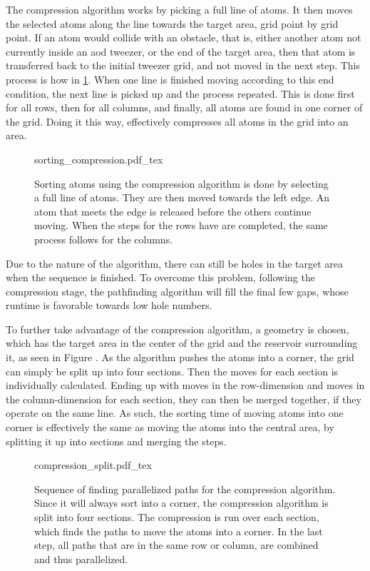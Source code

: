 The compression algorithm works by picking a full line of atoms. It then moves the selected atoms along the line towards the target area, grid point by grid point. If an atom would collide with an obstacle, that is, either another atom not currently inside an \ac{aod} tweezer, or the end of the target area, then that atom is transferred back to the initial tweezer grid, and not moved in the next step. This process is how in \ref{fig:sorting_compression}. When one line is finished moving according to this end condition, the next line is picked up and the process repeated. This is done first for all rows, then for all columns, and finally, all atoms are found in one corner of the grid. Doing it this way, effectively compresses all atoms in the grid into an area.

\begin{figure}[ht]
\label{fig:sorting_compression}
\centering
	{sorting_compression.pdf_tex}
	\caption{Sorting atoms using the compression algorithm is done by selecting a full line of atoms. They are then moved towards the left edge. An atom that meets the edge is released before the others continue moving. When the steps for the rows have are completed, the same process follows for the columns.}
\end{figure}

Due to the nature of the algorithm, there can still be holes in the target area when the sequence is finished. To overcome this problem, following the compression stage, the pathfinding algorithm will fill the final few gaps, whose runtime is favorable towards low hole numbers.

To further take advantage of the compression algorithm, a geometry is chosen, which has the target area in the center of the grid and the reservoir surrounding it, as seen in Figure . As the algorithm pushes the atoms into a corner, the grid can simply be split up into four sections. Then the moves for each section is individually calculated. Ending up with moves in the row-dimension and moves in the column-dimension for each section, they can then be merged together, if they operate on the same line. As such, the sorting time of moving atoms into one corner is effectively the same as moving the atoms into the central area, by splitting it up into sections and merging the steps.

\begin{figure}[ht]
\label{fig:compression_split}
\centering
	{compression_split.pdf_tex}
	\caption{Sequence of finding parallelized paths for the compression algorithm. Since it will always sort into a corner, the compression algorithm is split into four sections. The compression is run over each section, which finds the paths to move the atoms into a corner. In the last step, all paths that are in the same row or column, are combined and thus parallelized.}
\end{figure}

